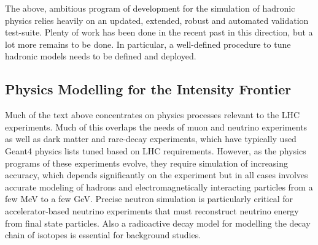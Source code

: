 \documentclass[12pt,a4paper]{article}
\begin{document}
{The above, ambitious program of development for the simulation of
hadronic physics relies heavily on an updated, extended, robust and
automated validation test-suite. Plenty of work has been done in the
recent past in this direction, but a lot more remains to be done. In
particular, a well-defined procedure to tune hadronic models needs to be
defined and deployed.


\hypertarget{physics-modelling-for-the-intensity-frontier}{%
\subsection{Physics Modelling for the Intensity
Frontier}\label{physics-modelling-for-the-intensity-frontier}}

Much of the text above concentrates on physics processes relevant to the
LHC experiments. Much of this overlaps the needs of muon and neutrino
experiments as well as dark matter and rare-decay experiments, which
have typically used Geant4 physics lists tuned based on LHC
requirements. However, as the physics programs of these experiments evolve,
they require simulation of increasing accuracy, which depends significantly
on the experiment but in all cases involves accurate modeling of hadrons and
electromagnetically interacting particles from a few MeV to a few GeV.
Precise neutron simulation is
particularly critical for accelerator-based neutrino experiments that
must reconstruct neutrino energy from final state particles. Also a
radioactive decay model for modelling the decay chain of isotopes is
essential for background studies.

}
\end{document}
